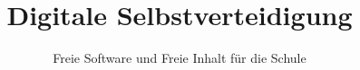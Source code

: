\documentclass{beamer}
\begin{document}
\title{Digitale Selbstverteidigung}
\subtitle{Freie Software und Freie Inhalt für die Schule}

\maketitle



\end{document}

